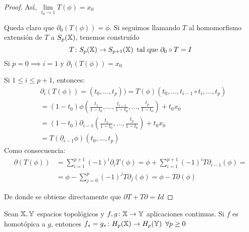 \begin{proof}
  Así, $\lim\limits_{t_0 \to 1} T(\phi) = x_0$

  Queda claro que $\partial_0(T(\phi)) = \phi$. Si seguimos llamando $T$ al homomorfismo extensión de $T$ a $S_{p}({\mathbb X})$, tenemos construído
  \[  T \colon S_{p}({\mathbb X}) \to S_{p+1}({\mathbb X}) \hspace{0.5em} \text{tal que } \partial_0 \circ  T = I \]
  Si $p = 0 \implies i = 1$ y $\partial_1( T(\phi)) = x_0$

  Si $1 \leq i \leq p+1$, entonces:
  \begin{align*}
    &\partial_i( T(\phi))=(t_0,\dots,t_p)) =  T(\phi)(t_0, \dots, t_{i-1} \circ t_i, \dots, t_p) \\
    &= (1-t_0)\phi(\frac{t_1}{1-t_0}, \dots, \frac{t_{i-1}}{1-t_0}, \dots, \frac{t_p}{1-t_0}) + t_0 x_0 \\
    &= (1-t_0)\partial_{i-1}(\frac{t_1}{1-t_0}, \dots, \frac{t_p}{1-t_0}) + t_0 x_0 \\
    &=  T(\partial_{i-1} \phi)(t_0, \dots, t_p)
  \end{align*}
  Como consecuencia:
  \begin{align*}
    \partial( T(\phi)) &= \sum\limits_{i = 1}^{p+1} (-1)^i \partial_i  T(\phi) =
    \phi + \sum\limits_{i = 1}^{p+1} (-1)^i  T \partial_{i-1}(\phi) = \\
    &= \phi - \sum\limits_{j = 0}^p (-1)^j  T \partial_j(\phi) = \phi -  T \partial(\phi)
  \end{align*}

  De donde se obtiene directamente que $\partial  T +  T \partial = Id$
\end{proof}

\begin{theorem}
  Sean ${\mathbb X}, {\mathbb Y}$ espacios topológicos y $f, g \colon {\mathbb X} \to {\mathbb Y}$ aplicaciones continuas. Si $f$ es homotópica a $g$,
  entonces $f_* = g_* \colon H_p({\mathbb X}) \to H_p({\mathbb Y}) \hspace{0.5em} \forall p \geq 0$
\end{theorem}

